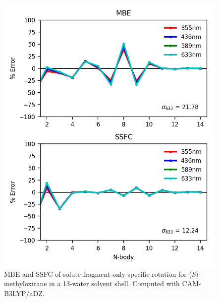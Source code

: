         \begin{figure}
            \centering
            \includegraphics[scale=0.75]{p1/graphs/metox_13_slt_rot.png}
            \caption{MBE and SSFC of solute-fragment-only specific rotation for (\textit{S})-methyloxirane in a 13-water solvent shell. Computed with CAM-B3LYP/aDZ.}
            \label{metox_13_slt}
        \end{figure}
